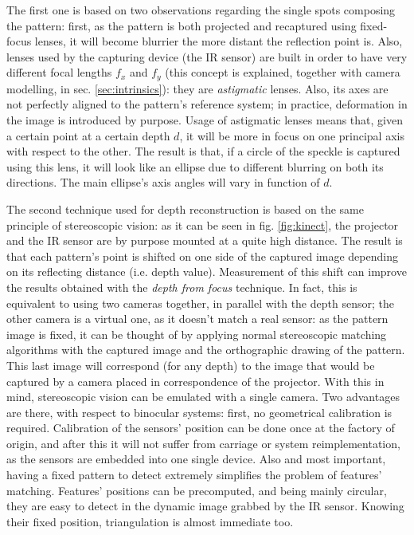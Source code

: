 The first one is based on two observations regarding the single spots
composing the pattern: first, as the pattern is both projected
and recaptured using fixed-focus lenses, it will become blurrier the more
distant the reflection point is. Also, lenses used by the capturing device (the
IR sensor) are built in order to have very different focal lengths $f_x$ and
$f_y$ (this concept is explained, together with camera modelling, in sec.
\ref{sec:intrinsics}): they are \emph{astigmatic} lenses. Also, its axes are not
perfectly aligned to the pattern's reference system; in practice, deformation in
the image is introduced by purpose. Usage of astigmatic lenses means that, given
a certain point at a certain depth $d$, it will be more in focus on one principal
axis with respect to the other. The result is that, if a circle of the speckle
is captured using this lens, it will look like an ellipse due to different
blurring on both its directions. The main ellipse's axis angles will vary in function
of $d$.

The second technique used for depth reconstruction is based on the same
principle of stereoscopic vision: as it can be seen in fig.
\ref{fig:kinect}, the projector and the IR sensor are by purpose mounted
at a quite high distance. The result is that each pattern's point is shifted on
one side of the captured image depending on its reflecting distance (i.e. depth
value). Measurement of this shift can improve the results obtained with the
\emph{depth from focus} technique. In fact, this is equivalent to using two
cameras together, in parallel with the depth sensor; the other camera is a
virtual one, as it doesn't match a real sensor: as the pattern image is fixed,
it can be thought of by applying normal stereoscopic matching algorithms with
the captured image and the orthographic drawing of the pattern. This last image
will correspond (for any depth) to the image that would be captured by a camera
placed in correspondence of the projector. With this in mind, stereoscopic
vision can be emulated with a single camera. 
Two advantages are there, with respect to binocular systems: first, no
geometrical calibration is required. Calibration of the sensors' position can be
done once at the factory of origin, and after this it will not suffer from
carriage or system reimplementation, as the sensors are embedded into one single
device. Also and most important, having a fixed pattern to detect extremely
simplifies the problem of features' matching. Features' positions can be
precomputed, and being mainly circular, they are easy to detect in the dynamic
image grabbed by the IR sensor. Knowing their fixed position, triangulation is
almost immediate too.

